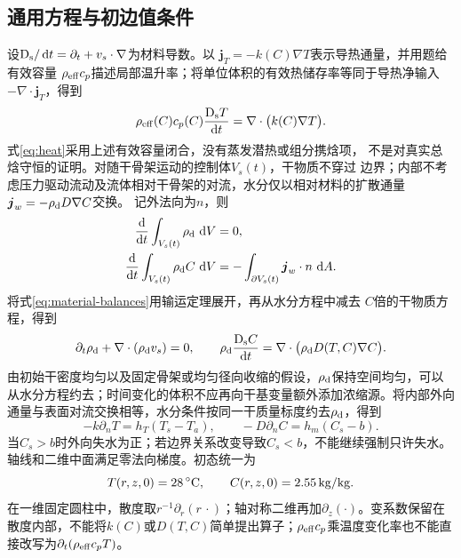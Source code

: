 \subsection{通用方程与初边值条件}
设$\mathrm D_{\mathrm s}/\mathop{}\!\mathrm d t=\partial_t+v_s\cdot\nabla$为材料导数。以
$\boldsymbol j_T=-k(C)\nabla T$表示导热通量，并用题给有效容量
$\rho_{\mathrm{eff}} c_p$描述局部温升率；将单位体积的有效热储存率等同于导热净输入
$-\nabla\cdot\boldsymbol j_T$，得到
\begin{equation}
\rho_{\mathrm{eff}}(C)c_p(C)\frac{\mathrm D_{\mathrm s} T}{\mathop{}\!\mathrm d t}
=\nabla\cdot\bigl(k(C)\nabla T\bigr).
\label{eq:heat}
\end{equation}
式\eqref{eq:heat}采用上述有效容量闭合，没有蒸发潜热或组分携焓项，
不是对真实总焓守恒的证明。对随干骨架运动的控制体$V_s(t)$，干物质不穿过
边界；内部不考虑压力驱动流动及流体相对干骨架的对流，水分仅以相对材料的扩散通量$\boldsymbol j_w=-\rho_{\mathrm d} D\nabla C$交换。
记外法向为$n$，则
\begin{equation}
\begin{aligned}
\frac{\mathop{}\!\mathrm d}{\mathop{}\!\mathrm d t}\int_{V_s(t)}\rho_{\mathrm d}\,\mathop{}\!\mathrm d V&=0,\\
\frac{\mathop{}\!\mathrm d}{\mathop{}\!\mathrm d t}\int_{V_s(t)}\rho_{\mathrm d} C\,\mathop{}\!\mathrm d V
&=-\int_{\partial V_s(t)}\boldsymbol j_w\cdot n\,\mathop{}\!\mathrm d A.
\end{aligned}
\label{eq:material-balances}
\end{equation}
将式\eqref{eq:material-balances}用输运定理展开，再从水分方程中减去
$C$倍的干物质方程，得到
\begin{equation}
\partial_t\rho_{\mathrm d}+\nabla\cdot(\rho_{\mathrm d} v_s)=0,\qquad
\rho_{\mathrm d}\frac{\mathrm D_{\mathrm s} C}{\mathop{}\!\mathrm d t}=\nabla\cdot\bigl(\rho_{\mathrm d} D(T,C)\nabla C\bigr).
\label{eq:moisture}
\end{equation}
由初始干密度均匀以及固定骨架或均匀径向收缩的假设，$\rho_{\mathrm d}$保持空间均匀，可以从水分方程约去；时间变化的体积不应再向干基变量额外添加浓缩源。将内部外向通量与表面对流交换相等，水分条件按同一干质量标度约去$\rho_{\mathrm d}$，得到
\begin{equation}
-k\partial_nT=h_T(T_s-T_a),\qquad
-D\partial_nC=h_m(C_s-b).
\label{eq:boundary}
\end{equation}
当$C_s>b$时外向失水为正；若边界关系改变导致$C_s<b$，不能继续强制只许失水。轴线和二维中面满足零法向梯度。初态统一为
\begin{equation}
T(r,z,0)=28\,{}^\circ\mathrm{C},\qquad C(r,z,0)=2.55\,\mathrm{kg/kg}.
\label{eq:initial}
\end{equation}
在一维固定圆柱中，散度取$r^{-1}\partial_r(r\,\cdot)$；轴对称二维再加$\partial_z(\cdot)$。变系数保留在散度内部，不能将$k(C)$或$D(T,C)$简单提出算子；$\rho_{\mathrm{eff}} c_p$乘温度变化率也不能直接改写为$\partial_t(\rho_{\mathrm{eff}} c_pT)$。

